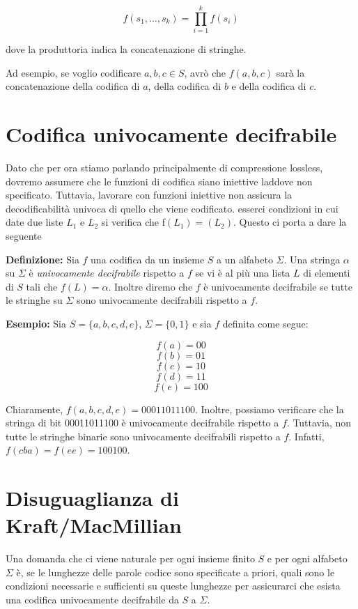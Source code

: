 \[ f(s_{1}, \dots, s_{k}) = \prod_{i=1}^k f(s_i)\]

dove la produttoria indica la concatenazione di stringhe.

Ad esempio, se voglio codificare \(a, b, c \in S\), avrò che \(f(a,b,c)\) sarà la concatenazione della codifica di \(a\), della codifica di \(b\) e della codifica di \(c\).

\section{Codifica univocamente decifrabile}
Dato che per ora stiamo parlando principalmente di compressione lossless, dovremo assumere che le funzioni di codifica siano iniettive laddove non specificato. Tuttavia, lavorare con funzioni iniettive non assicura la decodificabilità univoca di quello che viene codificato. esserci condizioni in cui date due liste \(L_1\) e \(L_2\) si verifica che f\((L_1) = (L_2)\). Questo ci porta a dare la seguente

\vspace{5mm}

\textbf{Definizione:} Sia \(f\) una codifica da un insieme \(S\) a un alfabeto \(\Sigma\). Una stringa \(\alpha\) su \(\Sigma\) è \textit{univocamente decifrabile} rispetto a \(f\) se vi è al più una lista \(L\) di elementi di \(S\) tali che \(f(L) = \alpha\). Inoltre diremo che \(f\) è univocamente decifrabile se tutte le stringhe su \(\Sigma\) sono univocamente decifrabili rispetto a \(f\).

\vspace{5mm}

\textbf{Esempio:} Sia \(S = \{a,b,c,d,e\}\), \(\Sigma = \{0,1\}\) e sia \(f\) definita come segue:

\[f(a) = 00\]
\[f(b) = 01\]
\[f(c) = 10\]
\[f(d) = 11\]
\[f(e) = 100\]

Chiaramente, \(f(a,b,c,d,e) = 00011011100\). Inoltre, possiamo verificare che la stringa di bit 00011011100 è univocamente decifrabile rispetto a \(f\). Tuttavia, non tutte le stringhe binarie sono univocamente decifrabili rispetto a \(f\).  Infatti, \(f(cba) = f(ee) = 100100\).

\section{Disuguaglianza di Kraft/MacMillian}
Una domanda che ci viene naturale per ogni insieme finito \(S\) e per ogni alfabeto \(\Sigma\) è, se le lunghezze delle parole codice sono specificate a priori, quali sono le condizioni necessarie e sufficienti su queste lunghezze per assicurarci che esista una codifica univocamente decifrabile da \(S\) a \(\Sigma\). 

